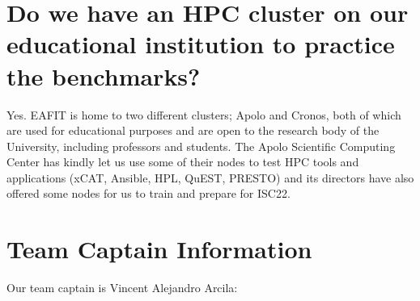 \documentclass[11pt,a4paper,twocolumn]{article}
\begin{document}
\section{Do we have an HPC cluster on our educational institution to practice the benchmarks?}

Yes. EAFIT is home to two different clusters; Apolo and Cronos, both of which are used for educational purposes and are open to the research body of the University, including professors and students. The Apolo Scientific Computing Center has kindly let us use some of their nodes to test HPC tools and applications (xCAT, Ansible, HPL, QuEST, PRESTO) and its directors have also offered some nodes for us to train and prepare for ISC22.

\section{Team Captain Information}
Our team captain is Vincent Alejandro Arcila:
\end{document}

